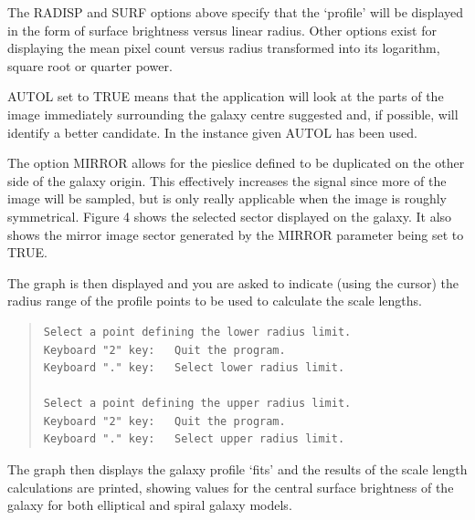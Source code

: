 \documentclass[twoside,11pt]{article}
\newenvironment{myquote}{\begin{quote}\begin{small}}{\end{small}\end{quote}}
\begin{document}
The RADISP and SURF options above specify that the `profile' will be displayed
in the form of surface brightness versus linear radius. Other options exist for
displaying the mean pixel count versus radius transformed into its
logarithm, square root or quarter power.

AUTOL set to TRUE means that the application will look at the parts of the
image immediately surrounding the galaxy centre suggested 
and, if possible, will identify a better candidate. In the instance given 
AUTOL has been used.
  
The option MIRROR allows for the pieslice
defined to be duplicated on the other side of the galaxy
origin. This effectively increases the signal since more of the image will be
sampled, but is only really applicable when the image is roughly 
symmetrical. Figure 4 shows the selected sector displayed on the galaxy. It
also shows the mirror image sector generated by the MIRROR parameter being
set to TRUE.
                    
The graph is then displayed and you are asked to indicate (using the cursor) 
the radius range of the profile points to be used to calculate the scale 
lengths.

\begin{myquote}
\begin{verbatim}
Select a point defining the lower radius limit.
Keyboard "2" key:   Quit the program.
Keyboard "." key:   Select lower radius limit.

Select a point defining the upper radius limit.
Keyboard "2" key:   Quit the program.
Keyboard "." key:   Select upper radius limit.
\end{verbatim}
\end{myquote}
 
The graph then displays the galaxy profile `fits' and the 
results of the scale length calculations are printed, showing
values for the central surface brightness of the galaxy for both elliptical 
and spiral galaxy models.
\end{document}

